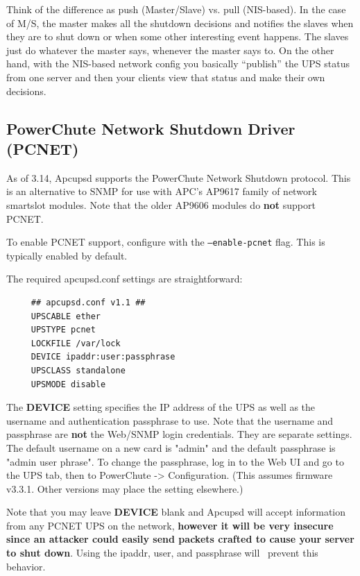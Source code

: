Think of the difference as push (Master/Slave) vs. pull (NIS-based). In the
case of M/S, the master makes all the shutdown decisions and notifies the
slaves when they are to shut down or when some other interesting event
happens. The slaves just do whatever the master says, whenever the master says
to. On the other hand, with the NIS-based network config you basically
``publish'' the UPS status from one server and then your clients view that
status and make their own decisions.  


\subsection*{PowerChute Network Shutdown Driver (PCNET)}

As of 3.14, Apcupsd supports the PowerChute Network Shutdown protocol.
This is an alternative to SNMP for use with APC's AP9617 family of 
network smartslot modules. Note that the older AP9606 modules do \textbf{not}
support PCNET.

To enable PCNET support, configure with the \texttt{{---}enable-pcnet} flag.
This is typically enabled by default.

The required apcupsd.conf settings are straightforward:

\begin{verbatim}
     ## apcupsd.conf v1.1 ##
     UPSCABLE ether
     UPSTYPE pcnet
     LOCKFILE /var/lock
     DEVICE ipaddr:user:passphrase
     UPSCLASS standalone
     UPSMODE disable
\end{verbatim}

The \textbf{DEVICE} setting specifies the IP address of the UPS as well as 
the username and authentication passphrase to use. Note that the username 
and passphrase are \textbf{not} the Web/SNMP login credentials. They are 
separate settings. The default username on a new card is "admin" and the 
default passphrase is "admin user phrase". To change the passphrase, log 
in to the Web UI and go to the UPS tab, then to PowerChute -> Configuration.
(This assumes firmware v3.3.1. Other versions may place the setting 
elsewhere.)

Note that you may leave \textbf{DEVICE} blank and Apcupsd will accept 
information from any PCNET UPS on the network, \textbf{however it will be 
very insecure since an attacker could easily send packets crafted to cause 
your server to shut down}. Using the ipaddr, user, and passphrase will \
prevent this behavior.

